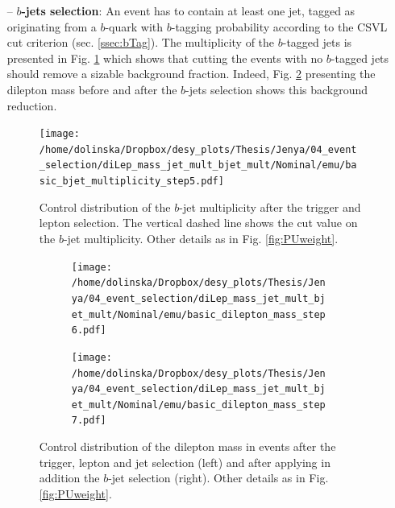 \begin{itemize}
%  
 \item [--] \textbf{$b$-jets selection}: An event has to contain at least one jet, tagged as originating from a $b$-quark with $b$-tagging probability according to the CSVL cut criterion (sec. \ref{ssec:bTag}). 
 The multiplicity of the $b$-tagged jets is presented in Fig. \ref{fig:bjetMultiSel} which shows that cutting the events with no $b$-tagged jets should remove a sizable background fraction. 
 Indeed, Fig. \ref{fig:mllbJetSel} presenting the dilepton mass before and after the $b$-jets selection shows this background reduction.
 
 \begin{figure}[h]
  \centering
  \texttt{[image: /home/dolinska/Dropbox/desy\_plots/Thesis/Jenya/04\_event\_selection/diLep\_mass\_jet\_mult\_bjet\_mult/Nominal/emu/basic\_bjet\_multiplicity\_step5.pdf]}
  \caption{Control distribution of the $b$-jet multiplicity after the trigger and lepton selection. The vertical dashed line shows the cut value on the $b$-jet multiplicity.
   Other details as in Fig. \ref{fig:PUweight}.}
  \label{fig:bjetMultiSel}
  \end{figure}
  
 \begin{figure}[h]
 \centering
 \begin{subfigure}
   \centering
   \texttt{[image: /home/dolinska/Dropbox/desy\_plots/Thesis/Jenya/04\_event\_selection/diLep\_mass\_jet\_mult\_bjet\_mult/Nominal/emu/basic\_dilepton\_mass\_step6.pdf]}
 \end{subfigure}
 \begin{subfigure}
   \centering
   \texttt{[image: /home/dolinska/Dropbox/desy\_plots/Thesis/Jenya/04\_event\_selection/diLep\_mass\_jet\_mult\_bjet\_mult/Nominal/emu/basic\_dilepton\_mass\_step7.pdf]}
 \end{subfigure}
 \caption{Control distribution of the dilepton mass in events after the trigger, lepton and jet selection (left) and after applying in addition the $b$-jet selection (right). 
 Other details as in Fig. \ref{fig:PUweight}.}
 \label{fig:mllbJetSel}
 \end{figure}
 

\end{itemize}
